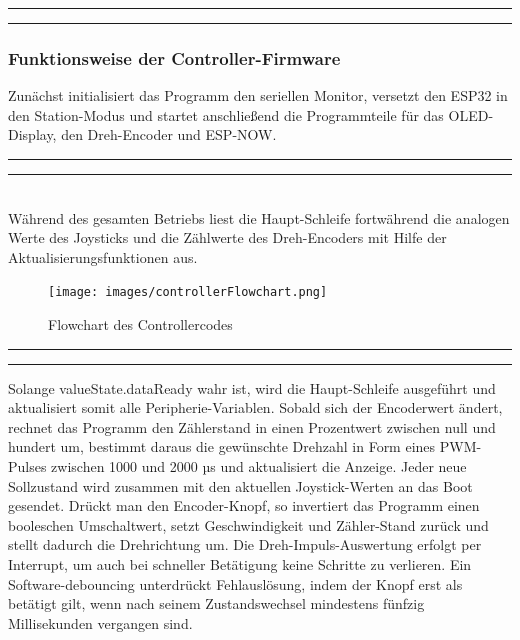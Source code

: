 \documentclass[a4paper,12pt]{article}
\begin{document}
\noindent\rule{\linewidth}{0.4pt}  %



\noindent\rule{\linewidth}{0.4pt} %



\subsubsection{Funktionsweise der Controller-Firmware}
\label{sec:Funktionsweise der Controller-Firmware}

Zunächst initialisiert das Programm den seriellen Monitor, versetzt den ESP32 in den Station-Modus und startet anschließend die Programmteile für das OLED-Display, den Dreh-Encoder und ESP-NOW. 

\newpage
\noindent\rule{\linewidth}{0.4pt}  %

\noindent\rule{\linewidth}{0.4pt}\\[0.5em]  %
Während des gesamten Betriebs liest die Haupt-Schleife fortwährend die analogen Werte des Joysticks und die Zählwerte des Dreh-Encoders mit Hilfe der Aktualisierungsfunktionen aus. 

\begin{figure}[H]
    \centering
    \texttt{[image: images/controllerFlowchart.png]}
    \caption{Flowchart des Controllercodes}
    \label{Controlller-Flowchart}
\end{figure}

\newpage
\noindent\rule{\linewidth}{0.4pt}  %

\noindent\rule{\linewidth}{0.4pt}  %
Solange valueState.dataReady wahr ist, wird die Haupt-Schleife ausgeführt und aktualisiert somit alle Peripherie-Variablen. Sobald sich der Encoderwert ändert, rechnet das Programm den Zählerstand in einen Prozentwert zwischen null und hundert um, bestimmt daraus die gewünschte Drehzahl in Form eines PWM-Pulses zwischen 1000 und 2000 µs und aktualisiert die Anzeige. Jeder neue Sollzustand wird zusammen mit den aktuellen Joystick-Werten an das Boot gesendet. Drückt man den Encoder-Knopf, so invertiert das Programm einen booleschen Umschaltwert, setzt Geschwindigkeit und Zähler-Stand zurück und stellt dadurch die Drehrichtung um. Die Dreh-Impuls-Auswertung erfolgt per Interrupt, um auch bei schneller Betätigung keine Schritte zu verlieren. Ein Software-\gls{debouncing} unterdrückt Fehlauslösung, indem der Knopf erst als betätigt gilt, wenn nach seinem Zustandswechsel mindestens fünfzig Millisekunden vergangen sind.
\end{document}
